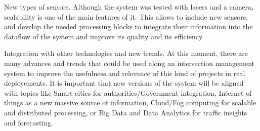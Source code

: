 New types of sensors. Although the system was tested with lasers and a camera, scalability is one of the main features of it. This allows to include new sensors, and develop the needed processing blocks to integrate their information into the dataflow of the system and improve its quality and its efficiency.

Integration with other technologies and new trends. At this moment, there are many advances and trends that could be used along an intersection management system to improve the usefulness and relevance of this kind of projects in real deployements. It is important that new versions of the system will be aligned with topics like Smart cities for authorities/Government integration, Internet of things as a new massive source of information, Cloud/Fog computing for scalable and distributed processing, or Big Data and Data Analytics for traffic insights and forecasting.
